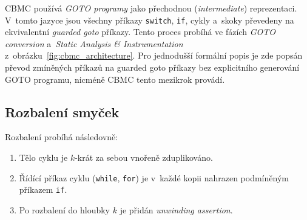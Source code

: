 \documentclass[a4paper, 11pt]{article}
\begin{document}
CBMC používá \emph{GOTO programy} jako přechodnou (\emph{intermediate}) reprezentaci.
V~tomto jazyce jsou všechny příkazy \texttt{switch}, \texttt{if}, cykly a~skoky převedeny na ekvivalentní \emph{guarded goto} příkazy.
Tento proces probíhá ve fázích \emph{GOTO conversion} a~\emph{Static Analysis \& Instrumentation} z~obrázku~\ref{fig:cbmc_architecture}.
Pro jednodušší formální popis je zde popsán převod zmíněných příkazů na guarded goto příkazy bez explicitního generování GOTO programu, nicméně CBMC tento mezikrok provádí.

\subsection{Rozbalení smyček}\label{sec:CBMC_Desc_LoopUnwinding}

Rozbalení probíhá následovně:
\begin{enumerate}
    \item Tělo cyklu je $k$-krát za sebou vnořeně zduplikováno.
    \item Řídící příkaz cyklu (\texttt{while}, \texttt{for}) je v~každé kopii nahrazen podmíněným příkazem \texttt{if}.
    \item Po rozbalení do hloubky $k$ je přidán \emph{unwinding assertion}.
\end{enumerate}
\end{document}
